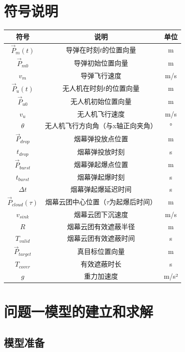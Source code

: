 \documentclass[12pt,a4paper]{article}
\begin{document}
\section{符号说明}
\begin{table}[H]
\centering
\begin{tabular}{ccc}
\toprule
\textbf{符号} & \textbf{说明} & \textbf{单位} \\
\midrule
$\vec{P}_m(t)$ & 导弹在时刻$t$的位置向量 & m \\
$\vec{P}_{m0}$ & 导弹初始位置向量 & m \\
$v_m$ & 导弹飞行速度 & m/s \\
$\vec{P}_u(t)$ & 无人机在时刻$t$的位置向量 & m \\
$\vec{P}_{u0}$ & 无人机初始位置向量 & m \\
$v_u$ & 无人机飞行速度 & m/s \\
$\theta$ & 无人机飞行方向角（与x轴正向夹角） & ° \\
$\vec{P}_{drop}$ & 烟幕弹投放点位置 & m \\
$t_{drop}$ & 烟幕弹投放时刻 & s \\
$\vec{P}_{burst}$ & 烟幕弹起爆点位置 & m \\
$t_{burst}$ & 烟幕弹起爆时刻 & s \\
$\Delta t$ & 烟幕弹起爆延迟时间 & s \\
$\vec{P}_{cloud}(\tau)$ & 烟幕云团中心位置（$\tau$为起爆后时间） & m \\
$v_{sink}$ & 烟幕云团下沉速度 & m/s \\
$R$ & 烟幕云团有效遮蔽半径 & m \\
$T_{valid}$ & 烟幕云团有效遮蔽时间 & s \\
$\vec{P}_{target}$ & 真目标位置向量 & m \\
$T_{cover}$ & 有效遮蔽时长 & s \\
$g$ & 重力加速度 & m/s² \\
\bottomrule
\end{tabular}
\end{table}

\newpage

\section{问题一模型的建立和求解}

\subsection{模型准备}
\end{document}
